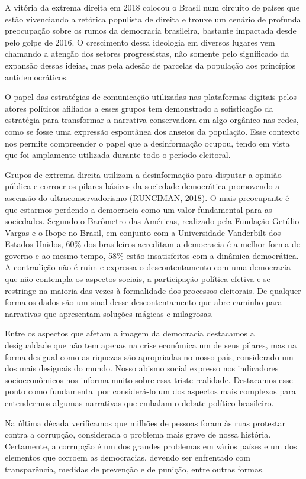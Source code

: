 A vitória da extrema direita em 2018 colocou o Brasil num circuito de
países que estão vivenciando a retórica populista de direita e trouxe um
cenário de profunda preocupação sobre os rumos da democracia brasileira,
bastante impactada desde pelo golpe de 2016. O crescimento dessa
ideologia em diversos lugares vem chamando a atenção dos setores
progressistas, não somente pelo significado da expansão dessas ideias,
mas pela adesão de parcelas da população aos princípios
antidemocráticos.

O papel das estratégias de comunicação utilizadas nas plataformas
digitais pelos atores políticos afiliados a esses grupos tem demonstrado
a sofisticação da estratégia para transformar a narrativa conservadora
em algo orgânico nas redes, como se fosse uma expressão espontânea dos
anseios da população. Esse contexto nos permite compreender o papel que
a desinformação ocupou, tendo em vista que foi amplamente utilizada
durante todo o período eleitoral.

Grupos de extrema direita utilizam a desinformação para disputar a
opinião pública e corroer os pilares básicos da sociedade democrática
promovendo a ascensão do ultraconservadorismo (RUNCIMAN, 2018). O mais
preocupante é que estarmos perdendo a democracia como um valor
fundamental para as sociedades. Segundo o Barômetro das Américas,
realizado pela Fundação Getúlio Vargas e o Ibope no Brasil, em conjunto
com a Universidade Vanderbilt dos Estados Unidos, 60\% dos brasileiros
acreditam a democracia é a melhor forma de governo e ao mesmo tempo,
58\% estão insatisfeitos com a dinâmica democrática. A contradição não é
ruim e expressa o descontentamento com uma democracia que não contempla
os aspectos sociais, a participação política efetiva e se restringe na
maioria das vezes à formalidade dos processos eleitorais. De qualquer
forma os dados são um sinal desse descontentamento que abre caminho para
narrativas que apresentam soluções mágicas e milagrosas.

Entre os aspectos que afetam a imagem da democracia destacamos a
desigualdade que não tem apenas na crise econômica um de seus pilares,
mas na forma desigual como as riquezas são apropriadas no nosso país,
considerado um dos mais desiguais do mundo. Nosso abismo social expresso
nos indicadores socioeconômicos nos informa muito sobre essa triste
realidade. Destacamos esse ponto como fundamental por considerá-lo um
dos aspectos mais complexos para entendermos algumas narrativas que
embalam o debate político brasileiro.

Na última década verificamos que milhões de pessoas foram às ruas
protestar contra a corrupção, considerada o problema mais grave de nossa
história. Certamente, a corrupção é um dos grandes problemas em vários
países e um dos elementos que corroem as democracias, devendo ser
enfrentado com transparência, medidas de prevenção e de punição, entre
outras formas.

